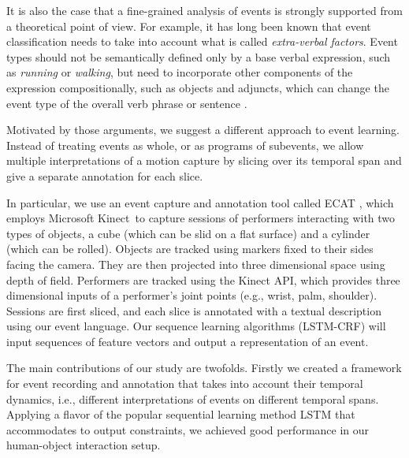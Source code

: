 \documentclass{esann}
\begin{document}
\iffalse Take the event \say{A person rolls A past B} as an example. Zooming into different parts of the event, we see different things. At the beginning, the performer reaches his hand to A, A starts to roll closer to B till some point of time that we can claim that A moves past B. A might continue rolling, with or without force from the performer's hand. \fi

\iffalse
For example, imagine a scenario in which a human agent takes a \textit{pedagogic role} and a robotic agent needs to learn to perform gradually more complex activities. 
\fi

It is also the case that
a fine-grained analysis of events is strongly supported from a theoretical point of view. For example, it has long been known that event classification needs to take into account what is called \textit{extra-verbal factors}. Event types should not be semantically defined only by a base verbal expression, such as \textit{running} or \textit{walking}, but  need to incorporate other components of the expression compositionally, such as objects and adjuncts, which can change the event type of the overall verb phrase or sentence \cite{Pustejovsky1995}. 

Motivated by those arguments, we suggest a different approach to event learning. Instead of treating events as whole, or as programs of subevents, we allow multiple interpretations of a motion capture by slicing over its temporal span and give a separate annotation for each slice. 

In particular, we use an event capture and annotation tool called ECAT \cite{do2016ECAT}, which employs Microsoft Kinect\circledR\ to capture sessions of performers interacting with two types of objects, a cube (which can be slid on a flat surface) and a cylinder (which can be rolled). Objects are tracked using markers fixed to their sides facing the camera. They are then projected into three dimensional space using depth of field. Performers are tracked using the Kinect API, which provides three dimensional inputs of a performer's joint points (e.g., wrist, palm, shoulder). Sessions are first sliced, and each slice is annotated with a textual description using our event language. Our sequence learning algorithms (LSTM-CRF) will input sequences of feature vectors and output a representation of an event. 

The main contributions of our study are twofolds. Firstly we created a framework for event recording and annotation that takes into account their temporal dynamics, i.e., different interpretations of events on different temporal spans. Applying a flavor of the popular sequential learning method LSTM that accommodates to output constraints, we achieved good performance in our human-object interaction setup. 
\end{document}

